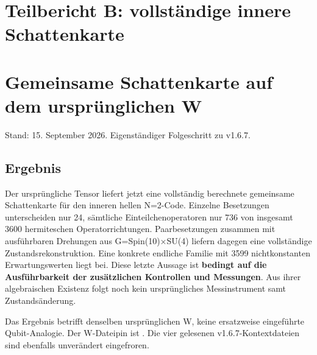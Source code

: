 \section{Teilbericht B: vollständige innere
Schattenkarte}\label{teilbericht-b-vollstuxe4ndige-innere-schattenkarte}

\section{Gemeinsame Schattenkarte auf dem ursprünglichen
W}\label{gemeinsame-schattenkarte-auf-dem-urspruxfcnglichen-w}

Stand: 15. September 2026. Eigenständiger Folgeschritt zu v1.6.7.

\subsection{Ergebnis}\label{ergebnis-2}

Der ursprüngliche Tensor liefert jetzt eine vollständig berechnete
gemeinsame Schattenkarte für den inneren hellen N=2-Code. Einzelne
Besetzungen unterscheiden nur 24, sämtliche Einteilchenoperatoren nur
736 von insgesamt 3600 hermiteschen Operatorrichtungen. Paarbesetzungen
zusammen mit ausführbaren Drehungen aus G=Spin(10)×SU(4) liefern dagegen
eine vollständige Zustandsrekonstruktion. Eine konkrete endliche Familie
mit 3599 nichtkonstanten Erwartungswerten liegt bei. Diese letzte
Aussage ist \textbf{bedingt auf die Ausführbarkeit der zusätzlichen
Kontrollen und Messungen}. Aus ihrer algebraischen Existenz folgt noch
kein ursprüngliches Messinstrument samt Zustandsänderung.

Das Ergebnis betrifft denselben ursprünglichen W, keine ersatzweise
eingeführte Qubit-Analogie. Der W-Dateipin ist
.
Die vier gelesenen v1.6.7-Kontextdateien sind ebenfalls unverändert
eingefroren.

